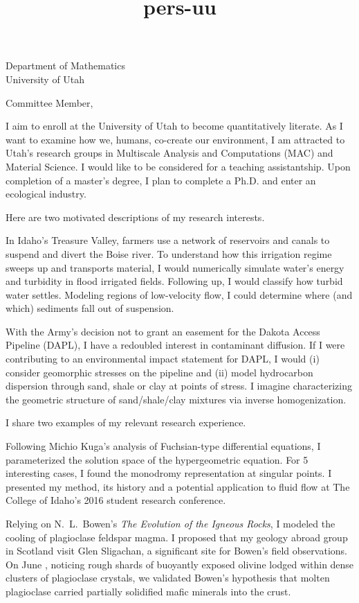 \documentclass[10pt]{letter}
\date{}
\title{pers-uu}
\newcommand{\topic}[1]{\textmd{#1}}
\begin{document}
\begin{letter}{Department of Mathematics\\University of Utah}

\opening{Committee Member,}
I aim to enroll at the University of Utah to become quantitatively literate. As I want to examine how we, humans, co-create our environment, I am attracted to Utah's research groups in Multiscale Analysis and Computations (MAC) and Material Science. I would like to be considered for a teaching assistantship. Upon completion of a master's degree, I plan to complete a Ph.D. and enter an ecological industry.

Here are two motivated descriptions of my research interests. 
\begin{description}[topsep=0pt]
	\item[Sediment Transport]
		In Idaho's Treasure Valley, farmers use a network of reservoirs and canals to suspend and divert the Boise river. To understand how this irrigation regime sweeps up and transports material, I would numerically simulate water's energy and turbidity in flood irrigated fields. Following up, I would classify how turbid water settles. Modeling regions of low-velocity flow, I could determine where (and which) sediments fall out of suspension.
	\item[Ground Water Contamination]
		With the Army's decision not to grant an easement for the Dakota Access Pipeline (DAPL), I have a redoubled interest in contaminant diffusion. If I were contributing to an environmental impact statement for DAPL, I would (i) consider geomorphic stresses on the pipeline and (ii) model hydrocarbon dispersion through sand, shale or clay at points of stress. I imagine characterizing the geometric structure of sand/shale/clay mixtures via inverse homogenization.
\end{description}

I share two examples of my relevant research experience. 
\begin{description}[topsep=0pt]
  \item[Galois Theory \& Fuchsian Equations] 
    Following Michio Kuga's analysis of Fuchsian-type differential equations, I parameterized the solution space of the hypergeometric equation. For 5 interesting cases, I found the monodromy representation at singular points. I presented my method, its history and a potential application to \topic{fluid flow} at The College of Idaho's 2016 student research conference.
  \item[Igneous Dikes in Scotland]
    Relying on N.~L.~Bowen's \emph{The Evolution of the Igneous Rocks}, I modeled the cooling of plagioclase feldspar magma. I proposed that my geology abroad group in Scotland visit Glen Sligachan, a significant site for Bowen's field observations. On June , noticing rough shards of buoyantly exposed olivine lodged within dense clusters of plagioclase crystals, we validated Bowen's hypothesis that molten plagioclase carried partially solidified mafic minerals into the crust. 
\end{description}


\end{letter}
\end{document}
